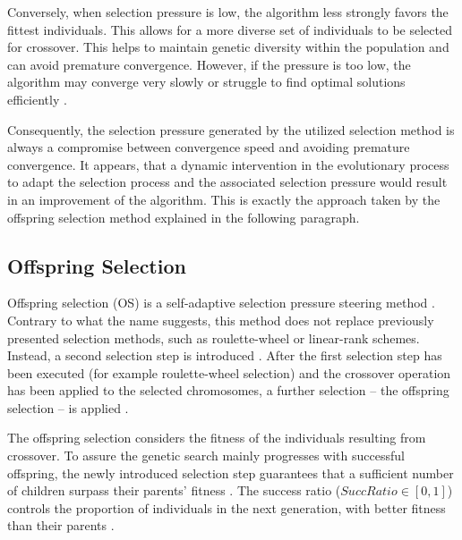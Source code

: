 \documentclass[sigconf]{acmart}
\begin{document}
Conversely, when selection pressure is low, the algorithm less strongly favors
the fittest individuals. This allows for a more diverse set of individuals
to be selected for crossover. This helps to maintain genetic diversity within
the population and can avoid premature convergence. However, if the pressure
is too low, the algorithm may converge very slowly or struggle to find optimal
solutions efficiently \cite{back1994selective}.

Consequently, the selection pressure generated by the utilized selection method
is always a compromise between convergence speed and avoiding premature
convergence. It appears, that a dynamic intervention in the evolutionary process
to adapt the selection process and the associated selection pressure would
result in an improvement of the algorithm. This is exactly the approach taken
by the offspring selection method explained in the following paragraph.


\subsection{Offspring Selection}
Offspring selection (OS) is a self-adaptive selection pressure steering method
\cite{Affenzeller2009}.
Contrary to what the name suggests, this method does not replace previously
presented selection methods, such as roulette-wheel or linear-rank schemes.
Instead, a second selection step is introduced \cite{Affenzeller2009}.
After the first selection step has been executed (for example roulette-wheel
selection) and the crossover operation has been applied to the selected
chromosomes, a further selection -- the offspring selection -- is applied
\cite{Affenzeller2009}.

The offspring selection considers the fitness of the individuals resulting from
crossover.
To assure the genetic search mainly progresses with successful offspring,
the newly introduced selection step guarantees that a sufficient number of
children surpass their parents' fitness \cite{Affenzeller2009}.
The success ratio ($SuccRatio \in [0, 1]$) controls the proportion of
individuals in the next generation, with better fitness than their parents
\cite{Affenzeller2009}.
\end{document}
